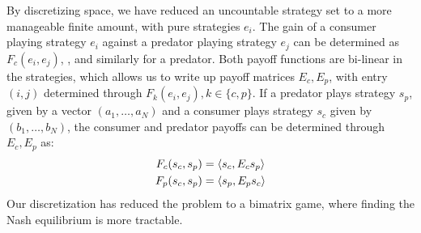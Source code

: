 By discretizing space, we have reduced an uncountable strategy set to a more manageable finite amount, with pure strategies $e_i$. The gain of a consumer playing strategy $e_i$ against a predator playing strategy $e_j$ can be determined as $F_c(e_i,e_j)$, , and similarly for a predator. Both payoff functions are bi-linear in the strategies, which allows us to write up payoff matrices $E_c, E_p$, with entry $(i,j)$ determined through $F_k(e_i,e_j), k \in \{c, p\}$. If a predator plays strategy $s_p$, given by a vector $(a_1,\dots,a_N)$ and a consumer plays strategy $s_c$ given by $(b_1,\dots,b_N)$, the consumer and predator payoffs can be determined through $E_c,E_p$ as:
\begin{align*}
  F_c(s_c,s_p)&=\left \langle s_c,E_c s_p \right \rangle \\
  F_p(s_c,s_p)&=\left \langle s_p,E_p s_c \right \rangle
\end{align*}
Our discretization has reduced the problem to a bimatrix game, where finding the Nash equilibrium is more tractable.


